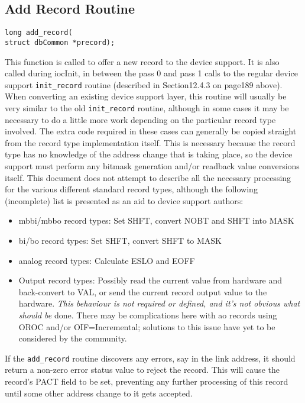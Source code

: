 \subsection{Add Record Routine}

\begin{verbatim}long add_record(
struct dbCommon *precord);
\end{verbatim}This function is called to offer a new record to the device support. It is also called during iocInit, in between the pass 0 and 
pass 1 calls to the regular device support \verb|init_record| routine (described in Section12.4.3 on page189 above). When 
converting an existing device support layer, this routine will usually be very similar to the old \verb|init_record| routine, 
although in some cases it may be necessary to do a little more work depending on the particular record type involved. The 
extra code required in these cases can generally be copied straight from the record type implementation itself. This is 
necessary because the record type has no knowledge of the address change that is taking place, so the device support must 
perform any bitmask generation and/or readback value conversions itself. This document does not attempt to describe all 
the necessary processing for the various different standard record types, although the following (incomplete) list is 
presented as an aid to device support authors:

\begin{itemize}\item mbbi/mbbo record types: Set SHFT, convert NOBT and SHFT into MASK

\item bi/bo record types: Set SHFT, convert SHFT to MASK

\item analog record types: Calculate ESLO and EOFF

\item Output record types: Possibly read the current value from hardware and back-convert to VAL, or send the current 
record output value to the hardware. \emph{This behaviour is not required or defined, and it's not obvious what should be }
done. There may be complications here with ao records using OROC and/or OIF=Incremental; solutions to this 
issue have yet to be considered by the community.

\end{itemize}If the \verb|add_record| routine discovers any errors, say in the link address, it should return a non-zero error status value to 
reject the record. This will cause the record's PACT field to be set, preventing any further processing of this record until 
some other address change to it gets accepted.

